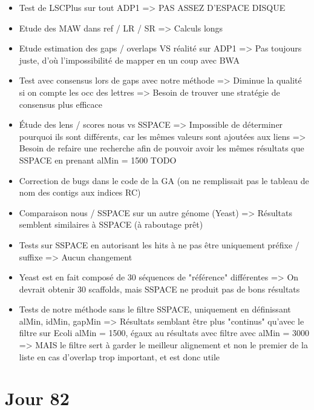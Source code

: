 \documentclass[12pt]{report}
\begin{document}
\begin{itemize}
	\item Test de LSCPlus sur tout ADP1 => PAS ASSEZ D'ESPACE DISQUE
	
	\item Etude des MAW dans ref / LR / SR => Calculs longs
	
	\item Etude estimation des gaps / overlaps VS réalité sur ADP1 => Pas toujours juste, d'où l'impossibilité de mapper en un coup avec BWA
	
	\item Test avec consensus lors de gaps avec notre méthode => Diminue la qualité si on compte les occ des lettres
		  => Besoin de trouver une stratégie de consensus plus efficace
		  
	\item Étude des lens / scores nous vs SSPACE => Impossible de déterminer pourquoi ils sont différents, car les mêmes valeurs sont
		  ajoutées aux liens => Besoin de refaire une recherche afin de pouvoir avoir les mêmes résultats que 
		  SSPACE en prenant alMin = 1500 TODO
		  
	\item Correction de bugs dans le code de la GA (on ne remplissait pas le tableau de nom des contigs aux indices RC)
		  
	\item Comparaison nous / SSPACE sur un autre génome (Yeast) => Résultats semblent similaires à SSPACE (à raboutage prêt)
	
	\item Tests sur SSPACE en autorisant les hits à ne pas être uniquement préfixe / suffixe => Aucun changement
	
	\item Yeast est en fait composé de 30 séquences de "référence" différentes => On devrait obtenir 30 scaffolds, mais SSPACE
		  ne produit pas de bons résultats
		  
	\item Tests de notre méthode sans le filtre SSPACE, uniquement en définissant alMin, idMin, gapMin => Résultats semblant être
		  plus "continus" qu'avec le filtre sur Ecoli alMin = 1500, égaux au résultats avec filtre avec alMin = 3000
		  => MAIS le filtre sert à garder le meilleur alignement et non le premier de la liste en cas d'overlap trop important, et est donc utile
\end{itemize}

\section{Jour 82}
\end{document}
